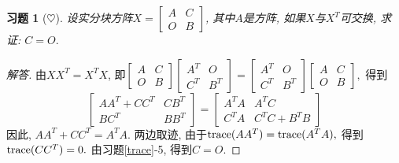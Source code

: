 \documentclass[UTF8]{ctexart}
\newtheorem{ex}[thm]{习题}
\begin{document}
\begin{ex}[$\heartsuit $]
设实分块方阵$X= \begin{bmatrix} A & C \\ O & B  \end{bmatrix} $, 其中$A$是方阵, 如果$X$与$X^T$可交换, 求证: $C = O.$
\end{ex}
\begin{proof}[解答]
由$XX^T = X^T X$, 即$\begin{bmatrix} A & C \\ O & B  \end{bmatrix} \begin{bmatrix} A^T & O \\ C^T & B^T  \end{bmatrix}  = \begin{bmatrix} A^T & O \\ C^T & B^T  \end{bmatrix}  \begin{bmatrix} A & C \\ O & B  \end{bmatrix} ,$ 得到
\[
\begin{bmatrix} AA^T + CC^T & CB^T \\ BC^T & BB^T  \end{bmatrix}  = \begin{bmatrix} A^TA & A^T C \\ C^TA & C^T C + B^T B  \end{bmatrix}
\]
因此, $AA^T + CC^T = A^T A.$ 两边取迹, 由于${\rm trace}(AA^T) ={\rm trace}( A^T A),$ 得到${\rm trace}(CC^T) = 0.$ 由习题\ref{trace}-5, 得到$C=O.$
\end{proof}
\end{document}
